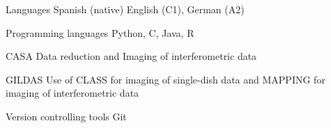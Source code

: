 

\begin{cvskills}

  \cvskill
    {Languages} %
    {Spanish (native) English (C1), German (A2)} %
    

  \cvskill
    {Programming languages} %
    {Python, C, Java, R} %


  \cvskill
    {CASA} %
    {Data reduction and Imaging of interferometric data} %


  \cvskill
    {GILDAS} %
    {Use of CLASS for imaging of single-dish data and MAPPING for imaging of interferometric data} %


  \cvskill
    {Version controlling tools} %
    {Git} %


\end{cvskills}
